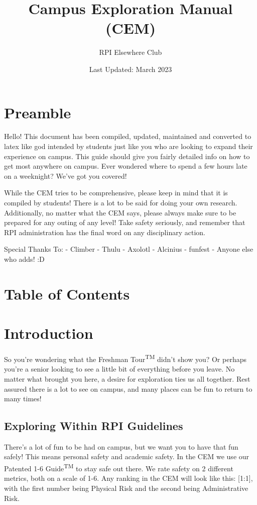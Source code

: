 \documentclass{article}
\title{Campus Exploration Manual (CEM)}
\author{RPI Elsewhere Club}
\date{Last Updated: March 2023}
\begin{document}
  \maketitle
  \section{Preamble}

  Hello! This document has been compiled, updated, maintained and converted to latex like god intended by students just like you who are looking to expand their experience on campus. This guide should give you fairly detailed info on how to get most anywhere on campus. Ever wondered where to spend a few hours late on a weeknight? We’ve got you covered!

While the CEM tries to be comprehensive, please keep in mind that it is compiled by students! There is a lot to be said for doing your own research. Additionally, no matter what the CEM says, please always make sure to be prepared for any outing of any level! Take safety seriously, and remember that RPI administration has the final word on any disciplinary action.

Special Thanks To:
- Climber
- Thulu
- Axolotl
- Alcinius
- funfest
- Anyone else who adds! :D

  \pagebreak
  \section{Table of Contents}
  \tableofcontents
  \pagebreak
  \section{Introduction}
  So you’re wondering what the Freshman Tour\textsuperscript{TM} didn’t show you? Or perhaps you’re a senior looking to see a little bit of everything before you leave. No matter what brought you here, a desire for exploration ties us all together. Rest assured there is a lot to see on campus, and many places can be fun to return to many times!
  \subsection{Exploring Within RPI Guidelines}
  There’s a lot of fun to be had on campus, but we want you to have that fun safely! This means personal safety and academic safety. In the CEM we use our Patented 1-6 Guide\textsuperscript{TM} to stay safe out there. We rate safety on 2 different metrics, both on a scale of 1-6. Any ranking in the CEM will look like this: [1:1], with the first number being Physical Risk and the second being Administrative Risk.
\end{document}
